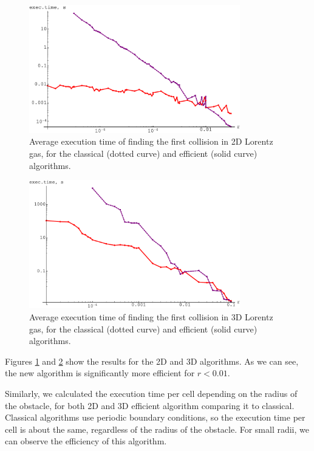 \documentclass[pre,amsmath,amssymb, twocolumn, showpacs]{revtex4-1}
\begin{document}
\begin{figure}
\centering
\includegraphics [width=260pt]{fig03.pdf}
\caption{Average execution time of finding the first collision in 2D Lorentz gas, for the classical (dotted curve) and efficient (solid curve) algorithms.}
\label{fig:fig05}
\end{figure}

\begin{figure}
\centering
\includegraphics [width=260pt]{fig04.pdf}
\caption{Average execution time of finding the first collision in 3D Lorentz gas, for the classical (dotted curve) and efficient (solid curve) algorithms.}
\label{fig:fig06}
\end{figure}

Figures \ref{fig:fig05} and \ref{fig:fig06} show the results for the 2D and 3D algorithms. As we can see, the new algorithm is significantly more efficient for $r < 0.01$.

Similarly, we calculated the execution time per cell depending on the radius of the obstacle, for both 2D and 3D efficient algorithm comparing it to classical. Classical algorithms use periodic boundary conditions, so the execution time per cell is about the same, regardless of the radius of the obstacle. 
For small radii, we can observe the efficiency of this algorithm.
\end{document}
